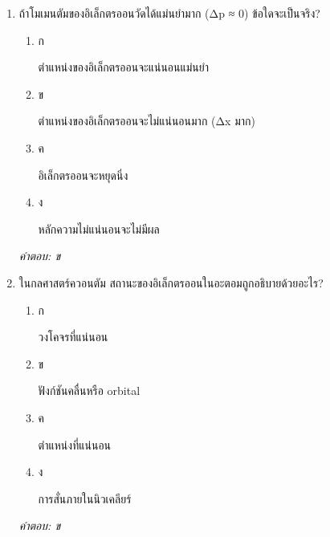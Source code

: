 \documentclass[12pt]{article}
\begin{document}
\begin{enumerate}[label=\arabic*., itemsep=0.5\baselineskip, topsep=0.5\baselineskip, leftmargin=*]
\item ถ้าโมเมนตัมของอิเล็กตรออนวัดได้แม่นยำมาก (Δp ≈ 0) ข้อใดจะเป็นจริง?
\begin{enumerate}[label=\alph*)., itemsep=0.3\baselineskip, topsep=0.3\baselineskip]
\item ก\ 
\begin{minipage}[t]{0.9\linewidth}
\raggedright ตำแหน่งของอิเล็กตรออนจะแน่นอนแม่นยำ
\end{minipage}
\item ข\ 
\begin{minipage}[t]{0.9\linewidth}
\raggedright ตำแหน่งของอิเล็กตรออนจะไม่แน่นอนมาก (Δx มาก)
\end{minipage}
\item ค\ 
\begin{minipage}[t]{0.9\linewidth}
\raggedright อิเล็กตรออนจะหยุดนิ่ง
\end{minipage}
\item ง\ 
\begin{minipage}[t]{0.9\linewidth}
\raggedright หลักความไม่แน่นอนจะไม่มีผล
\end{minipage}
\end{enumerate}
\vspace{-0.3\baselineskip}
\begin{small}
\textit{คำตอบ: ข}
\end{small}

\item ในกลศาสตร์ควอนตัม สถานะของอิเล็กตรออนในอะตอมถูกอธิบายด้วยอะไร?
\begin{enumerate}[label=\alph*)., itemsep=0.3\baselineskip, topsep=0.3\baselineskip]
\item ก\ 
\begin{minipage}[t]{0.9\linewidth}
\raggedright วงโคจรที่แน่นอน
\end{minipage}
\item ข\ 
\begin{minipage}[t]{0.9\linewidth}
\raggedright ฟังก์ชันคลื่นหรือ orbital
\end{minipage}
\item ค\ 
\begin{minipage}[t]{0.9\linewidth}
\raggedright ตำแหน่งที่แน่นอน
\end{minipage}
\item ง\ 
\begin{minipage}[t]{0.9\linewidth}
\raggedright การสั่นภายในนิวเคลียร์
\end{minipage}
\end{enumerate}
\vspace{-0.3\baselineskip}
\begin{small}
\textit{คำตอบ: ข}
\end{small}


\end{enumerate}
\end{document}

